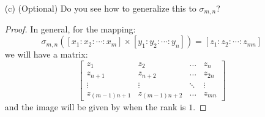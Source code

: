 \documentclass{article}
\begin{document}
\begin{itemize}
\begin{proof}
                ($J \subseteq \Im{\sigma_{1, 2}}$) The rank cannot be $0$ because there is no origin in $\mathbb{P}^{5}$. Then if we have rank $1$, one row is a scalar multiple of the other. So we have the set of points in $J$ as
                    \begin{equation*}
                        [z_{1} : z_{2} : z_{3} : rz_{1} : rz_{2} : rz_{3}]
                    \end{equation*}
                where $z_{1}, z_{2}, z_{3}, r$ not all $0$. But this is just in the image of $\sigma_{ 1, 2}$ as
                    \begin{equation*}
                        \sigma_{ 1, 2}([1 : r] \times [ z_{1} : z_{2} : z_{3}]) = [z_{1} : z_{2} : z_{3} : rz_{1} : rz_{2} : rz_{3}]
                    \end{equation*}
                which completes the proof.
            \end{proof}

        \item [(c)] (Optional) Do you see how to generalize this to $\sigma_{m, n}$? 
            \begin{proof}
                In general, for the mapping:
                    \begin{equation*}
                        \sigma_{m, n}([x_{1} : x_{2} : \cdots : x_{m}] \times[y_{1} : y_{2} : \cdots : y_{n}]) = [z_{1} : z_{2} : \cdots : z_{mn}]
                    \end{equation*}
                we will have a matrix:
                    \begin{equation*}
                        \begin{bmatrix}
                            z_{1}            & z_{2}            & \ldots & z_{n}  \\
                            z_{n + 1}        & z_{n + 2}        & \ldots & z_{2n} \\
                            \vdots           & \vdots           & \ddots & \vdots \\
                            z_{(m - 1)n + 1} & z_{(m - 1)n + 2} & \ldots & z_{mn}   
                        \end{bmatrix}
                    \end{equation*}
                and the image will be given by when the rank is $1$.
            \end{proof}
    \end{itemize}

\newpage
\end{document}
